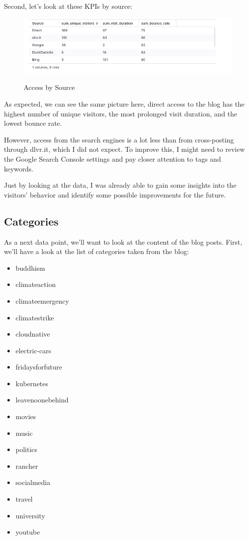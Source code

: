 Second, let's look at these KPIs by source:

\begin{figure}[H]
\centering
\caption {Access by Source}
\includegraphics[width=\linewidth]{images/access-source.png}
\label{fig:accessSource}
\end{figure}

As expected, we can see the same picture here, direct access to the blog has the highest number of unique visitors, the most prolonged visit duration, and the lowest bounce rate.

However, access from the search engines is a lot less than from cross-posting through dlvr.it, which I did not expect. To improve this, I might need to review the Google Search Console settings and pay closer attention to tags and keywords.

Just by looking at the data, I was already able to gain some insights into the visitors' behavior and identify some possible improvements for the future.

\subsection{Categories}

As a next data point, we'll want to look at the content of the blog posts. First, we'll have a look at the list of categories taken from the blog:

\begin{itemize}
\item buddhism
\item climateaction
\item climateemergency
\item climatestrike
\item cloudnative
\item electric-cars
\item fridaysforfuture
\item kubernetes
\item leavenoonebehind
\item movies
\item music
\item politics
\item rancher
\item socialmedia
\item travel
\item university
\item youtube
\end{itemize}

